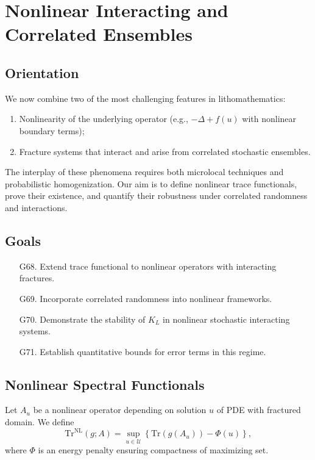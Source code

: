 \section{Nonlinear Interacting and Correlated Ensembles}
\label{sec:nonlinear-stochastic-extensions}

\subsection*{Orientation}

We now combine two of the most challenging features in lithomathematics:

\begin{enumerate}
  \item Nonlinearity of the underlying operator (e.g., $-\Delta + f(u)$ with nonlinear boundary terms);
  \item Fracture systems that interact and arise from correlated stochastic ensembles.
\end{enumerate}

The interplay of these phenomena requires both microlocal techniques and probabilistic homogenization.  
Our aim is to define nonlinear trace functionals, prove their existence, and quantify their robustness under correlated randomness and interactions.  

\subsection*{Goals}

\begin{itemize}
  \item[G68.] Extend trace functional to nonlinear operators with interacting fractures.  
  \item[G69.] Incorporate correlated randomness into nonlinear frameworks.  
  \item[G70.] Demonstrate the stability of $K_L$ in nonlinear stochastic interacting systems.  
  \item[G71.] Establish quantitative bounds for error terms in this regime.  
\end{itemize}

\subsection{Nonlinear Spectral Functionals}

\begin{definition}
Let $A_u$ be a nonlinear operator depending on solution $u$ of PDE with fractured domain.  
We define
\[
\mathrm{Tr}^{\mathrm{NL}}(g;A) = \sup_{u \in \mathcal{U}} \left\{ \mathrm{Tr}(g(A_u)) - \Phi(u) \right\},
\]
where $\Phi$ is an energy penalty ensuring compactness of maximizing set.  
\end{definition}

